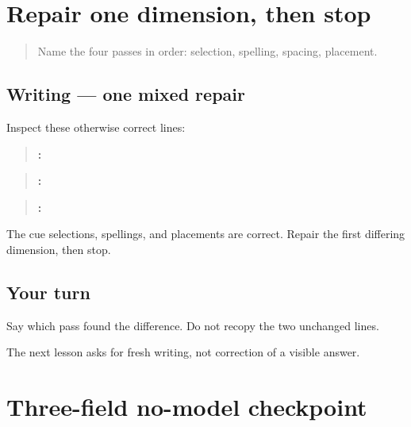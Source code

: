 \section[\texorpdfstring{\pa{ਭਾਸ਼ਾ} · \pa{ਰਿਹਾਇਸ਼} · \pa{ਕੰਮ} (three-field …)}{ਭਾਸ਼ਾ · ਰਿਹਾਇਸ਼ · ਕੰਮ (three-field …)}]{Repair one dimension, then stop}

\label{lesson:PA-W06-mixed-repair}



\begin{quote}
Name the four passes in order: selection, spelling, spacing, placement.
\end{quote}

\subsection*{Writing — one mixed repair}
Inspect these otherwise correct lines:

\begin{quote}
\textbf{: }
\end{quote}

\begin{quote}
\textbf{:}
\end{quote}

\begin{quote}
\textbf{: }
\end{quote}

The cue selections, spellings, and placements are correct. Repair the first differing dimension, then stop.

\subsection*{Your turn}
Say which pass found the difference. Do not recopy the two unchanged lines.

\begin{tcolorbox}[breakable,colback=teal!4,colframe=teal!35!black,title={Before you move on}]
The next lesson asks for fresh writing, not correction of a visible answer.
\end{tcolorbox}
\section[\texorpdfstring{\pa{ਭਾਸ਼ਾ}: \_\_\_\_\_\_ … (three-field …)}{ਭਾਸ਼ਾ: \_\_\_\_\_\_ … (three-field …)}]{Three-field no-model checkpoint}

\label{lesson:PA-W06-three-field-no-model}



